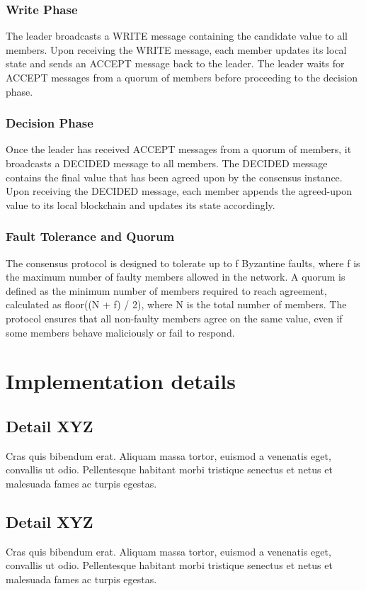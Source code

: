 \documentclass[runningheads]{llncs}
\begin{document}
\subsubsection{Write Phase}
The leader broadcasts a WRITE message containing the candidate value to all
members. Upon receiving the WRITE message, each member updates its local state
and sends an ACCEPT message back to the leader. The leader waits for ACCEPT
messages from a quorum of members before proceeding to the decision phase.
\subsubsection{Decision Phase}
Once the leader has received ACCEPT messages from a quorum of members, it
broadcasts a DECIDED message to all members. The DECIDED message contains the
final value that has been agreed upon by the consensus instance. Upon receiving
the DECIDED message, each member appends the agreed-upon value to its local
blockchain and updates its state accordingly.
\subsubsection{Fault Tolerance and Quorum}
The consensus protocol is designed to tolerate up to f Byzantine faults, where f
is the maximum number of faulty members allowed in the network. A quorum is
defined as the minimum number of members required to reach agreement, calculated
as floor((N + f) / 2), where N is the total number of members. The protocol
ensures that all non-faulty members agree on the same value, even if some
members behave maliciously or fail to respond.

%
\section{Implementation details}
\subsection{Detail XYZ}
Cras quis bibendum erat. Aliquam massa tortor, euismod a venenatis eget,
convallis ut odio. Pellentesque habitant morbi tristique senectus et netus et
malesuada fames ac turpis egestas.
%
\subsection{Detail XYZ}
Cras quis bibendum erat. Aliquam massa tortor, euismod a venenatis eget,
convallis ut odio. Pellentesque habitant morbi tristique senectus et netus et
malesuada fames ac turpis egestas.
%
\end{document}
